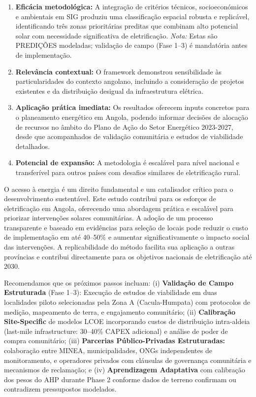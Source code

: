 \documentclass[12pt, a4paper]{article}
\begin{document}
\begin{enumerate}
\item \textbf{Eficácia metodológica:} A integração de critérios técnicos, socioeconómicos e ambientais em SIG produziu uma classificação espacial robusta e replicável, identificando três zonas prioritárias preditas que combinam alto potencial solar com necessidade significativa de eletrificação. \textit{Nota:} Estas são PREDIÇÕES modeladas; validação de campo (Fase 1--3) é mandatória antes de implementação.

\item \textbf{Relevância contextual:} O framework demonstrou sensibilidade às particularidades do contexto angolano, incluindo a consideração de projetos existentes e da distribuição desigual da infraestrutura elétrica.

\item \textbf{Aplicação prática imediata:} Os resultados oferecem inputs concretos para o planeamento energético em Angola, podendo informar decisões de alocação de recursos no âmbito do Plano de Ação do Setor Energético 2023-2027, desde que acompanhados de validação comunitária e estudos de viabilidade detalhados.

\item \textbf{Potencial de expansão:} A metodologia é escalável para nível nacional e transferível para outros países com desafios similares de eletrificação rural.
\end{enumerate}

O acesso à energia é um direito fundamental e um catalisador crítico para o desenvolvimento sustentável. Este estudo contribui para os esforços de eletrificação em Angola, oferecendo uma abordagem prática e escalável para priorizar intervenções solares comunitárias. A adoção de um processo transparente e baseado em evidências para seleção de locais pode reduzir o custo de implementação em até 40--50\% e aumentar significativamente o impacto social das intervenções. A replicabilidade do método facilita sua aplicação a outras províncias e contribui directamente para os objetivos nacionais de eletrificação até 2030.

Recomendamos que os próximos passos incluam: (i) 
\textbf{Validação de Campo Estruturada} (Fase 1--3): Execução de estudos de viabilidade em duas localidades piloto selecionadas pela Zona A (Cacula-Humpata) com protocolos de medição, mapeamento de terra, e engajamento comunitário; (ii) 
\textbf{Calibração Site-Specific} de modelos LCOE incorporando custos de distribuição intra-aldeia (last-mile infrastructure: 30--40\% CAPEX adicional) e análise de poder de compra comunitário; (iii) 
\textbf{Parcerias Público-Privadas Estruturadas:} colaboração entre MINEA, municipalidades, ONGs independentes de monitoramento, e operadores privados com cláusulas de governança comunitária e mecanismos de reclamação; e (iv) 
\textbf{Aprendizagem Adaptativa} com calibração dos pesos do AHP durante Phase 2 conforme dados de terreno confirmam ou contradizem pressupostos modelados.
\end{document}
